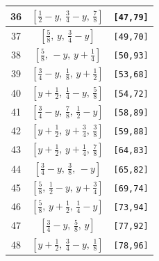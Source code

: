 \documentclass[fleqn,8pt]{jsarticle}
\begin{document}
\begin{longtable}{ccc}
36 & $\left[ \frac{1}{2} - y,\, \frac{3}{4} - y,\, \frac{7}{8} \right]$ & {\tt [47,79]} \\ \hline
37 & $\left[ \frac{5}{8},\, y,\, \frac{3}{4} - y \right]$ & {\tt [49,70]} \\ \hline
38 & $\left[ \frac{5}{8},\, - y,\, y + \frac{1}{4} \right]$ & {\tt [50,93]} \\ \hline
39 & $\left[ \frac{3}{4} - y,\, \frac{1}{8},\, y + \frac{1}{2} \right]$ & {\tt [53,68]} \\ \hline
40 & $\left[ y + \frac{1}{2},\, \frac{1}{4} - y,\, \frac{5}{8} \right]$ & {\tt [54,72]} \\ \hline
41 & $\left[ \frac{3}{4} - y,\, \frac{7}{8},\, \frac{1}{2} - y \right]$ & {\tt [58,89]} \\ \hline
42 & $\left[ y + \frac{1}{2},\, y + \frac{3}{4},\, \frac{3}{8} \right]$ & {\tt [59,88]} \\ \hline
43 & $\left[ y + \frac{1}{2},\, y + \frac{1}{4},\, \frac{7}{8} \right]$ & {\tt [64,83]} \\ \hline
44 & $\left[ \frac{3}{4} - y,\, \frac{3}{8},\, - y \right]$ & {\tt [65,82]} \\ \hline
45 & $\left[ \frac{5}{8},\, \frac{1}{2} - y,\, y + \frac{3}{4} \right]$ & {\tt [69,74]} \\ \hline
46 & $\left[ \frac{5}{8},\, y + \frac{1}{2},\, \frac{1}{4} - y \right]$ & {\tt [73,94]} \\ \hline
47 & $\left[ \frac{3}{4} - y,\, \frac{5}{8},\, y \right]$ & {\tt [77,92]} \\ \hline
48 & $\left[ y + \frac{1}{2},\, \frac{3}{4} - y,\, \frac{1}{8} \right]$ & {\tt [78,96]} \\
\end{longtable}
\renewcommand{\arraystretch}{1.2}
\end{document}
